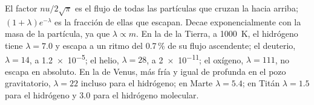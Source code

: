 El factor $n u/2\sqrt\pi$ es el flujo de todas las partículas que cruzan
la  hacia arriba; $(1 + \lambda)e^{-\lambda}$ es la fracción de ellas
que escapan. Decae exponencialmente con la masa de la partícula, ya que
$\lambda \propto m$. En la  de la Tierra, a \qty{1000}{K}, el hidrógeno
tiene $\lambda = 7.0$ y escapa a un ritmo del 0.7\,\% de su flujo
ascendente; el deuterio, $\lambda = 14$, a \num{1.2e-5}; el helio, $\lambda = 28$,
a \num{2e-11}; el oxígeno, $\lambda = 111$, no escapa en absoluto. En la  de
Venus, más fría y igual de profunda en el pozo gravitatorio, $\lambda = 22$ incluso para
el hidrógeno; en Marte $\lambda = 5.4$; en Titán $\lambda = 1.5$ para el hidrógeno
y 3.0 para el hidrógeno molecular.

